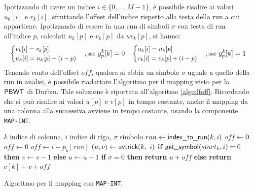 Ipotizzando di avere
un indice $i\in\{0,\ldots,M-1\}$, è possibile risalire ai valori
$u_k[i]$ e $v_k[i]$, sfruttando l'offset dell'indice rispetto alla
testa della run a cui appartiene. Ipotizzando di essere in una run
di simboli $\sigma$ con testa di run all'indice $p$, calcolati
$u_k[p]$ e $v_k[p]$ da $uv_k[p]$, si hanno: 
\begin{equation}
  \small
  \label{eq:naive2}
  \begin{cases}
    v_k[i]=v_k[p]\\
    u_k[i]=u_k[p]+(i-p)
  \end{cases},\mbox{sse } y^k_p[k]=0
  \quad
  \begin{cases}
    u_k[i]=u_k[p]\\
    v_k[i]=v_k[p]+(i-p)
  \end{cases},\mbox{sse } y^k_p[k]=1
\end{equation}
Tenendo conto dell'offset $off$, qualora si abbia un simbolo
$\sigma$ uguale a quello della run in analisi, è possibile
riadattare l'algoritmo per il 
mapping visto per la $\mbox{\rm {\sf PBWT}}$ di Durbin.
Tale soluzione è riportata all'algoritmo \ref{algo:lfoff}. 
Ricordando che si può risalire ai valori $u[p]$ e $v[p]$ in tempo costante,
anche il mapping da una colonna alla successiva avviene in tempo costante,
usando la componente \texttt{MAP-INT}.
\begin{algorithm}
  \begin{algorithmic}[1]
    \Comment $k$ indice di colonna, $i$ indice di riga, $\sigma$ simbolo
    \State $run\gets \mbox{\rm {\sf index\_to\_run}}(k,i)$
    \State $off\gets 0$
    \State $off\gets 0$
    \Else
    \State $off\gets i-p_k[run]$
    \EndIf
    \State $(u,v)\gets \mbox{\rm {\sf uvtrick}}(k,\,\,i)$
    \State \textbf{if} $\mbox{\rm {\sf get\_symbol}}(start_k, i)=0$ \textbf{then} $v\gets v-1$
    \textbf{else} $u\gets u-1$
    \EndIf
    \State \textbf{if} $\sigma = 0$ \textbf{then} \textbf{return} $u+off$
    \textbf{else} \textbf{return} $c[k]+v+off$
    \EndFunction
  \end{algorithmic}
  \caption{Algoritmo per il mapping con \texttt{MAP-INT}.}
  \label{algo:lfoff}
\end{algorithm}
